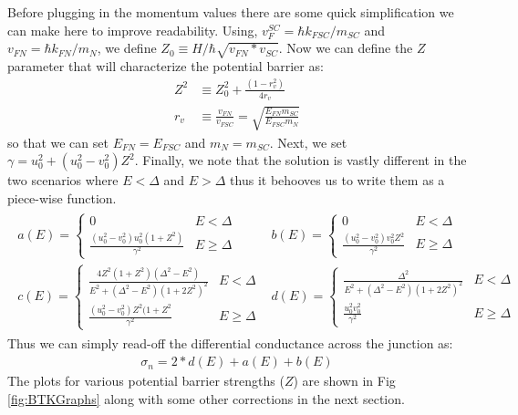 Before plugging in the momentum values there are some quick simplification we can make here to improve readability. Using, $v_{F}^{SC}=\hbar k_{FSC}/m_{SC}$ and $v_{FN}=\hbar k_{FN}/m_{N}$, we define $Z_{0}\equiv H/\hbar\sqrt{v_{FN}*v_{SC}}$. Now we can define the $Z$ parameter that will characterize the potential barrier as:
\begin{align}
    Z^{2}&\equiv Z_{0}^{2}+\frac{(1-r_{v}^{2})}{4r_{v}}\\
    r_{v}&\equiv\frac{v_{FN}}{v_{FSC}}=\sqrt{\frac{E_{FN}m_{SC}}{E_{FSC}m_{N}}}
\end{align}
so that we can set $E_{FN}=E_{FSC}$ and $m_{N}=m_{SC}$. Next, we set $\gamma=u_{0}^{2}+(u_{0}^{2}-v_{0}^{2})Z^{2}$. Finally, we note that the solution is vastly different in the two scenarios where $E<\Delta$ and $E>\Delta$ thus it behooves us to write them as a piece-wise function.
\begin{align}
    \begin{matrix}
    a(E)=\begin{cases}
    0 & E<\Delta\\
    \frac{(u_{0}^{2}-v_{0}^{2})u_{0}^{2}(1+Z^{2})}{\gamma^{2}} & E\geq\Delta\end{cases} &
    b(E)=\begin{cases}
    0 & E<\Delta\\
    \frac{(u_{0}^{2}-v_{0}^{2})v_{0}^{2}Z^{2}}{\gamma^{2}} & E\geq\Delta
    \end{cases}\\
    c(E)=\begin{cases}
    \frac{4Z^{2}(1+Z^{2})(\Delta^{2}-E^{2})}{E^{2}+(\Delta^{2}-E^{2})(1+2Z^{2})^{2}} & E<\Delta\\
    \frac{(u_{0}^{2}-v_{0}^{2})Z^{2}(1+Z^{2}}{\gamma^{2}} & E\geq\Delta
    \end{cases} &
    d(E)=\begin{cases}
    \frac{\Delta^{2}}{E^{2}+(\Delta^{2}-E^{2})(1+2Z^{2})^{2}} & E<\Delta\\
    \frac{u_{0}^{2}v_{0}^{2}}{\gamma^{2}} & E\geq\Delta
    \end{cases}
    \end{matrix}
\end{align}
Thus we can simply read-off the differential conductance across the junction as:
\begin{align}
\sigma_{n} = 2*d(E)+a(E)+b(E)
\end{align}
The plots for various potential barrier strengths ($Z$) are shown in Fig \ref{fig:BTKGraphs} along with some other corrections in the next section.

